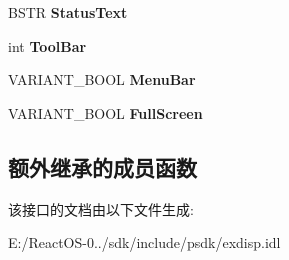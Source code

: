 \begin{DoxyCompactItemize}
B\+S\+TR {\bfseries Status\+Text}
\item 
\mbox{\label{interface_s_h_doc_vw_1_1_i_web_browser_app_ac85a9d6e4acb426d340b44568174f530}} 
int {\bfseries Tool\+Bar}
\item 
\mbox{\label{interface_s_h_doc_vw_1_1_i_web_browser_app_a69b0bf929889f86d259905a93bbd118f}} 
V\+A\+R\+I\+A\+N\+T\+\_\+\+B\+O\+OL {\bfseries Menu\+Bar}
\item 
\mbox{\label{interface_s_h_doc_vw_1_1_i_web_browser_app_af1b726534395b0d77cd847e1966f8d4e}} 
V\+A\+R\+I\+A\+N\+T\+\_\+\+B\+O\+OL {\bfseries Full\+Screen}
\end{DoxyCompactItemize}
\subsection*{额外继承的成员函数}


该接口的文档由以下文件生成\+:\begin{DoxyCompactItemize}
\item 
E\+:/\+React\+O\+S-\/0../sdk/include/psdk/exdisp.\+idl\end{DoxyCompactItemize}
